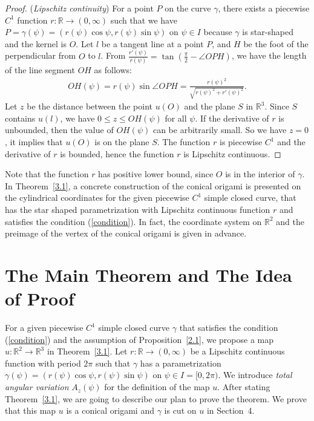 \documentclass{amsart}
\theoremstyle{plain}
\theoremstyle{definition}
\theoremstyle{remark}
\begin{document}
\begin{proof}
(\emph{Lipschitz continuity})
For a point $P$ on the curve $\gamma$, there exists a piecewise $C^1$ function $r \colon \mathbb{R}\to(0,\infty)$ such that we have $P=\gamma(\psi)=(r(\psi)\cos\psi,r(\psi)\sin\psi)$ on $\psi\in I$ because $\gamma$ is star-shaped and the kernel is $O$.
Let $l$ be a tangent line at a point $P$, and $H$ be the foot of the perpendicular from $O$ to $l$.
From $\frac{r'(\psi)}{r(\psi)}=\tan\left(\frac{\pi}2-\angle OPH\right)$, we have the length of the line segment $OH$ as follows:
\begin{align*}
OH(\psi)=r(\psi)\sin\angle OPH=\frac{r(\psi)^2}{\sqrt{r(\psi)^2+r'(\psi)^2}}.
\end{align*}
Let $z$ be the distance between the point $u(O)$ and the plane $S$ in $\mathbb{R}^3$.
Since $S$ contains $u(l)$, we have $0\le z\le OH(\psi)$ for all $\psi$.
If the derivative of $r$ is unbounded, then the value of $OH(\psi)$ can be arbitrarily small. %
So we have $z=0$, it implies that $u(O)$ is on the plane $S$.
The function $r$ is piecewise $C^1$ and the derivative of $r$ is bounded, hence the function $r$ is Lipschitz continuous.
\end{proof}

Note that the function $r$ has positive lower bound, since $O$ is in the interior of $\gamma$.
In Theorem~\ref{3.1}, a concrete construction of the conical origami is presented on the cylindrical coordinates for the given piecewise $C^1$ simple closed curve, that has the star shaped parametrization with Lipschitz continuous function $r$ and satisfies the condition (\ref{condition}).
In fact, the coordinate system on $\mathbb{R}^2$ and the preimage of the vertex of the conical origami is given in advance.









\bigskip



\section{The Main Theorem and The Idea of Proof}%
For a given piecewise $C^1$ simple closed curve $\gamma$ that satisfies the condition (\ref{condition}) and the assumption of 
Proposition~\ref{2.1}, we propose a map $u \colon \mathbb{R}^2\to\mathbb{R}^3$ in Theorem~\ref{3.1}.
Let $r \colon \mathbb{R}\to(0,\infty)$ be a Lipschitz continuous function with period $2\pi$ such that $\gamma$ has a parametrization $\gamma(\psi)=(r(\psi)\cos\psi,r(\psi)\sin\psi)$ on $\psi\in I=[0,2\pi)$.
We introduce \emph{total angular variation} $A_z(\psi)$ for the definition of the map $u$.
After stating Theorem~\ref{3.1}, we are going to describe our plan to prove the theorem.  
We prove that this map $u$ is a conical origami and $\gamma$ is cut on $u$ in Section~4.
\end{document}
